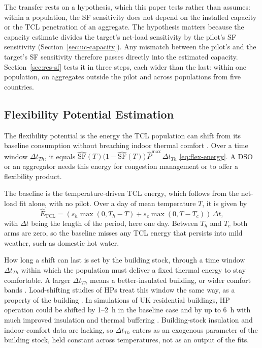 The transfer rests on a hypothesis, which this paper tests rather than assumes: within a population, the SF sensitivity does not depend on the installed capacity or the TCL penetration of an aggregate. The hypothesis matters because the capacity estimate divides the target's net-load sensitivity by the pilot's SF sensitivity (Section~\ref{sec:uc-capacity}). Any mismatch between the pilot's and the target's SF sensitivity therefore passes directly into the estimated capacity. Section~\ref{sec:res-sf} tests it in three steps, each wider than the last: within one population, on aggregates outside the pilot and across populations from five countries.

\subsection{Flexibility Potential Estimation}
\label{sec:uc-flex}
\label{sec:flex}

The flexibility potential is the energy the TCL population can shift from its baseline consumption without breaching indoor thermal comfort \cite{Zir19}. Over a time window $\Delta t_{Th}$, it equals $\hat{\mathrm{SF}}(T)\big(1-\hat{\mathrm{SF}}(T)\big)\,\hat{P}^{\max}\,\Delta t_{Th}$ \eqref{eq:flex-energy}. A DSO or an aggregator needs this energy for congestion management or to offer a flexibility product.

The baseline is the temperature-driven TCL energy, which follows from the net-load fit alone, with no pilot. Over a day of mean temperature $T$, it is given by
\begin{equation}
\hat{E}_{\mathrm{TCL}} = \left ( s_h \max(0, T_h - T) + s_c \max(0, T-T_c) \right ) \,\Delta t,
\label{eq:energy}
\end{equation}
with $\Delta t$ being the length of the period, here one day. Between $T_h$ and $T_c$ both arms are zero, so the baseline misses any TCL energy that persists into mild weather, such as domestic hot water.

How long a shift can last is set by the building stock, through a time window $\Delta t_{Th}$ within which the population must deliver a fixed thermal energy to stay comfortable. A larger $\Delta t_{Th}$ means a better-insulated building, or wider comfort bands \cite{Cha16}. Load-shifting studies of HPs treat this window the same way, as a property of the building \cite{Hon13}. In simulations of UK residential buildings, HP operation could be shifted by 1--2~h in the baseline case and by up to 6~h with much improved insulation and thermal buffering \cite{Hon13}. Building-stock insulation and indoor-comfort data are lacking, so $\Delta t_{Th}$ enters as an exogenous parameter of the building stock, held constant across temperatures, not as an output of the fits.

